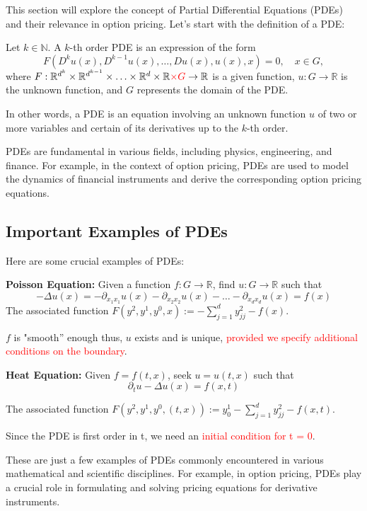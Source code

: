 This section will explore the concept of Partial Differential Equations (PDEs) and their relevance in option pricing. Let's start with the definition of a PDE:

\begin{definition}
    Let $k \in \mathbb{N}$. A $k$-th order PDE is an expression of the form
\[F(D^k u(x), D^{k-1} u(x), \ldots, Du(x), u(x), x) = 0, \quad x \in G,\]
where $F : \mathbb{R}^{d^k} \times \mathbb{R}^{d^{k-1}} \times \ldots \times \mathbb{R}^d \times \mathbb{R} \textcolor{red}{\times G} \rightarrow \mathbb{R}$ is a given function, $u : G \rightarrow \mathbb{R}$ is the unknown function, and $G$ represents the domain of the PDE.
\end{definition}

In other words, a PDE is an equation involving an unknown function $u$ of two or more variables and certain of its derivatives up to the $k$-th order.

PDEs are fundamental in various fields, including physics, engineering, and finance. For example, in the context of option pricing, PDEs are used to model the dynamics of financial instruments and derive the corresponding option pricing equations.

\subsection{Important Examples of PDEs}

Here are some crucial examples of PDEs:

\textbf{Poisson Equation:}
Given a function $f : G \rightarrow \mathbb{R}$, find $u : G \rightarrow \mathbb{R}$ such that
\[-\Delta u(x) = -\partial_{x_1 x_1} u(x) - \partial_{x_2 x_2} u(x) - \ldots - \partial_{x_d x_d} u(x) = f(x)\]
The associated function $F(y^2, y^1, y^0, x) := -\sum_{j=1}^d y^{2}_{j j} - f(x)$.

$f$ is "smooth” enough thus, $u$ exists and is unique, \textcolor{red}{provided we specify
additional conditions on the boundary}.

\textbf{Heat Equation:}
Given $f = f(t, x)$, seek $u = u(t, x)$ such that
\[\partial_t u - \Delta u(x) = f(x, t)\]

The associated function $F(y^2, y^1, y^0, (t, x)) := y^1_0 - \sum_{j=1}^d y^{2}_{j j} - f(x, t)$.

Since the PDE is first order in t, we need an \textcolor{red}{initial condition for t = 0}.

These are just a few examples of PDEs commonly encountered in various mathematical and scientific disciplines. For example, in option pricing, PDEs play a crucial role in formulating and solving pricing equations for derivative instruments.

